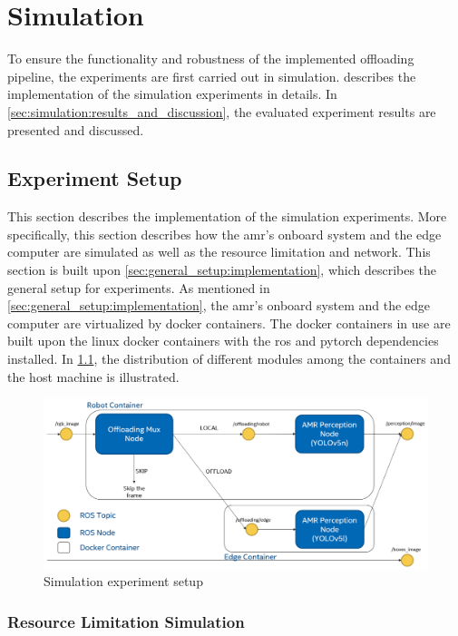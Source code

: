 \chapter{Simulation}\label{ch:simulation}

To ensure the functionality and robustness of the implemented offloading pipeline, the experiments are first carried out in simulation.  describes the implementation of the simulation experiments in details. In \cref{sec:simulation:results_and_discussion}, the evaluated experiment results are presented and discussed. 

\section{Experiment Setup}\label{sec:simulation:experiment_setup}

This section describes the implementation of the simulation experiments. More specifically, this section describes how the \gls{amr}'s onboard system and the edge computer are simulated as well as the resource limitation and network. This section is built upon \cref{sec:general_setup:implementation}, which describes the general setup for experiments. As mentioned in \cref{sec:general_setup:implementation}, the \gls{amr}'s onboard system and the edge computer are virtualized by \gls{docker} containers. The \gls{docker} containers in use are built upon the \gls{linux} docker containers with the \gls{ros} and \gls{pytorch} dependencies installed. In \cref{fig:simulation_experiment_setup}, the distribution of different modules among the containers and the host machine is illustrated. 

\begin{figure}[htp]
    \centering
    \includegraphics[width=0.8\linewidth]{figures/setup/general_setup.png}
    \caption{Simulation experiment setup}
    \label{fig:simulation_experiment_setup}
\end{figure}

\subsection{Resource Limitation Simulation}

